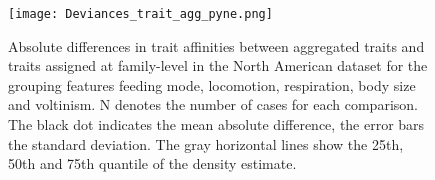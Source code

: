 \documentclass[../Draft_harmonization_paper.tex]{subfiles}
\begin{document}
\begin{figure}[H]
  \centering
  \texttt{[image: Deviances\_trait\_agg\_pyne.png]}
  \caption{Absolute differences in trait affinities between aggregated traits and traits assigned at family-level in the North American dataset for the grouping features feeding mode, locomotion, respiration, body size and voltinism. N denotes the number of cases for each comparison. The black dot indicates the mean absolute difference, the error bars the standard deviation. The gray horizontal lines show the 25th, 50th and 75th quantile of the density estimate.}
  \label{fig:diff_aggr_traits_pyne}
\end{figure}
\end{document}
